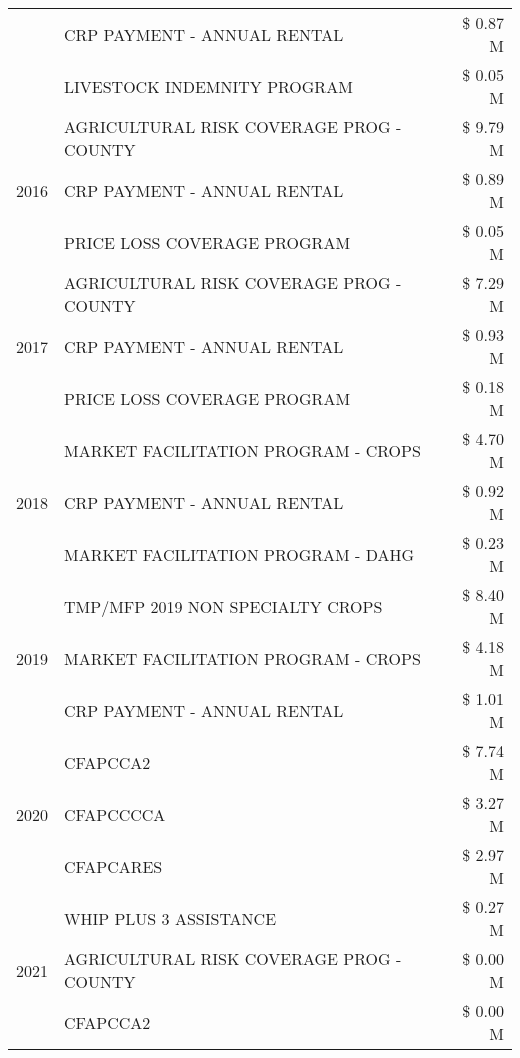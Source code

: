\begin{tabular}{llr}
 & CRP PAYMENT - ANNUAL RENTAL & \$ 0.87 M \\
 & LIVESTOCK INDEMNITY PROGRAM & \$ 0.05 M \\
\cline{1-3}
\multirow[t]{3}{*}{2016} & AGRICULTURAL RISK COVERAGE PROG - COUNTY      & \$ 9.79 M \\
 & CRP PAYMENT - ANNUAL RENTAL                   & \$ 0.89 M \\
 & PRICE LOSS COVERAGE PROGRAM                   & \$ 0.05 M \\
\cline{1-3}
\multirow[t]{3}{*}{2017} & AGRICULTURAL RISK COVERAGE PROG - COUNTY & \$ 7.29 M \\
 & CRP PAYMENT - ANNUAL RENTAL & \$ 0.93 M \\
 & PRICE LOSS COVERAGE PROGRAM & \$ 0.18 M \\
\cline{1-3}
\multirow[t]{3}{*}{2018} & MARKET FACILITATION PROGRAM - CROPS & \$ 4.70 M \\
 & CRP PAYMENT - ANNUAL RENTAL & \$ 0.92 M \\
 & MARKET FACILITATION PROGRAM - DAHG & \$ 0.23 M \\
\cline{1-3}
\multirow[t]{3}{*}{2019} & TMP/MFP 2019 NON SPECIALTY CROPS & \$ 8.40 M \\
 & MARKET FACILITATION PROGRAM - CROPS & \$ 4.18 M \\
 & CRP PAYMENT - ANNUAL RENTAL & \$ 1.01 M \\
\cline{1-3}
\multirow[t]{3}{*}{2020} & CFAPCCA2 & \$ 7.74 M \\
 & CFAPCCCCA & \$ 3.27 M \\
 & CFAPCARES & \$ 2.97 M \\
\cline{1-3}
\multirow[t]{3}{*}{2021} & WHIP PLUS 3 ASSISTANCE & \$ 0.27 M \\
 & AGRICULTURAL RISK COVERAGE PROG - COUNTY & \$ 0.00 M \\
 & CFAPCCA2 & \$ 0.00 M \\
\cline{1-3}
\bottomrule
\end{tabular}
